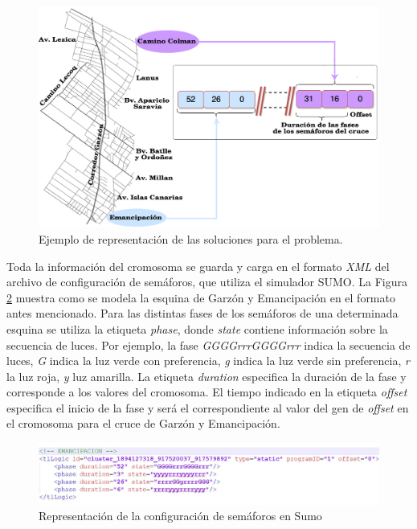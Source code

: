 \begin{figure}[!ht]
	\centering
	\includegraphics[width=0.85\linewidth]{Figures/mapa_genoma}
	\caption{Ejemplo de representación de las soluciones para el problema.} 
	\label{fig:cromosoma1}
\end{figure}

Toda la información del cromosoma se guarda y carga en el formato \emph{XML} del archivo de configuración de semáforos, que utiliza el simulador SUMO. La Figura \ref{fig:rep_sumo} muestra como se modela la esquina de Garzón y Emancipación en el formato antes mencionado. Para las distintas fases de los semáforos de una determinada esquina se utiliza la etiqueta \emph{phase}, donde \emph{state} contiene información sobre la secuencia de luces. Por ejemplo, la fase \emph{GGGGrrrGGGGrrr} indica la secuencia de luces, \emph{G} indica la luz verde con preferencia, \emph{g} indica la luz verde sin preferencia, \emph{r} la luz roja, \emph{y} luz amarilla. La etiqueta \emph{duration} especifica la duración de la fase y corresponde a los valores del cromosoma. El tiempo indicado en la etiqueta \emph{offset} especifica el inicio de la fase y será el correspondiente al valor del gen de \emph{offset} en el cromosoma para el cruce de Garzón y Emancipación.


\begin{figure}[ht]
	\centering
	\includegraphics[width=\linewidth]{Figures/rep_sumo}
	\caption{Representación de la configuración de semáforos en Sumo}
	\label{fig:rep_sumo}
\end{figure}

